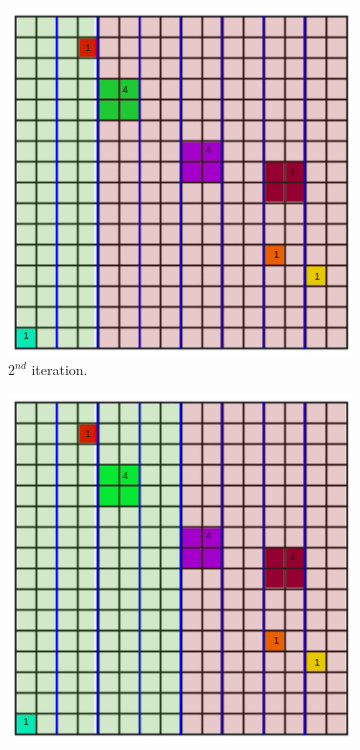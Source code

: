 \documentclass[11pt,a4paper]{article}
\begin{document}
\begin{figure}[H]
\begin{subfigure}[b]{0.475\textwidth}
         \includegraphics[width=\textwidth]{images/kdtree/grid_3.png}
         \caption{$2^{nd} $ iteration.}
         \label{fig:pi_5000}
     \end{subfigure}
     \hfill
     \begin{subfigure}[b]{0.475\textwidth}
         \centering
         \includegraphics[width=\textwidth]{images/kdtree/grid_5.png}

\end{subfigure}
\end{figure}
\end{document}
